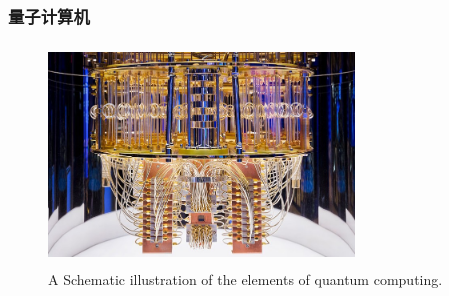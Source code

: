 \begin{frame}
	\frametitle{量子计算机}
            \begin{figure}
        \centering
                \includegraphics[height=2.3in, width=3.2in, viewport=0 0 767 511,clip]{Figures/Quantum_Computing.jpg}
		\caption{\tiny{\textrm{A Schematic illustration of the elements of quantum computing.}}}
		\label{Fig:Quantum_Computing}
            \end{figure}
\end{frame}


